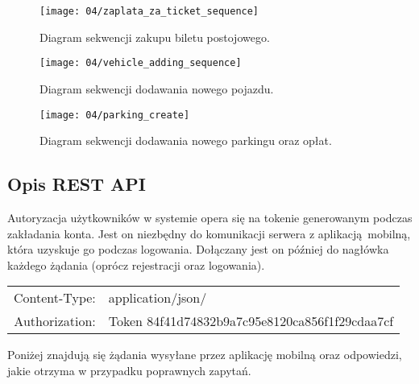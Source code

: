 \begin{figure}[p]
	\begin{center}
		\texttt{[image: 04/zaplata\_za\_ticket\_sequence]}
	\end{center}
	\caption{Diagram sekwencji zakupu biletu postojowego.}
\end{figure}

\begin{figure}[p]
	\begin{center}
		\texttt{[image: 04/vehicle\_adding\_sequence]}
	\end{center}
	\caption{Diagram sekwencji dodawania nowego pojazdu.}
\end{figure}

\begin{figure}[p]
	\begin{center}
		\texttt{[image: 04/parking\_create]}
	\end{center}
	\caption{Diagram sekwencji dodawania nowego parkingu oraz opłat.}
\end{figure}

\newpage

\subsection{Opis REST API}

Autoryzacja użytkowników w systemie opera się na tokenie generowanym podczas zakładania konta. Jest on niezbędny do komunikacji serwera z aplikacją mobilną, która uzyskuje go podczas logowania. Dołączany jest on później do nagłówka każdego żądania (oprócz rejestracji oraz logowania).

\label{naglowek_zadania}
\vspace{-0.3cm}
\begin{table}[h]
	\begin{center}
		\begin{tabular}{ rl }
			Content-Type:&application/json/\\
			Authorization:&Token 84f41d74832b9a7c95e8120ca856f1f29cdaa7cf\\
		\end{tabular}
	\end{center}
\end{table}

Poniżej znajdują się żądania wysyłane przez aplikację mobilną oraz odpowiedzi, jakie otrzyma w przypadku poprawnych zapytań.

